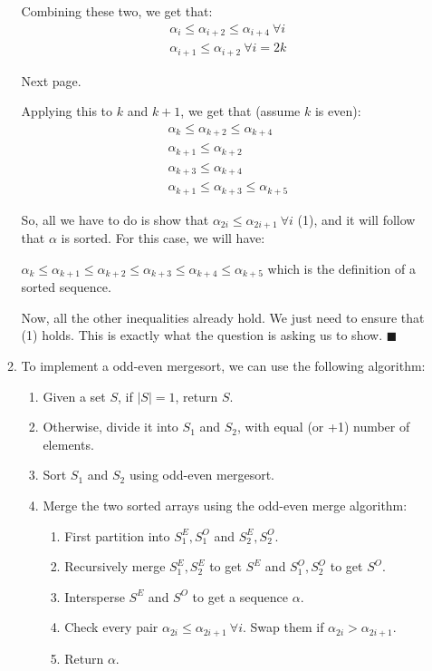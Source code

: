 \documentclass[a4paper]{article}
\begin{document}
\begin{enumerate}
\begin{enumerate}
    Combining these two, we get that:
    \begin{align*}
        \alpha_{i} \leq \alpha_{i + 2} \leq \alpha_{i + 4}\ \forall i\\
        \alpha_{i+1} \leq \alpha_{i + 2}\ \forall i = 2k
    \end{align*}

    Next page.
    \newpage

    Applying this to $k$ and $k+1$, we get that (assume $k$ is even):
    \begin{align*}
        \alpha_{k} \leq \alpha_{k+2} \leq \alpha_{k+4}\\
        \alpha_{k+1} \leq \alpha_{k + 2}\\
        \alpha_{k+3} \leq \alpha_{k + 4}\\
        \alpha_{k+1} \leq \alpha_{k+3} \leq \alpha_{k+5}
    \end{align*}
    
    So, all we have to do is show that $\alpha_{2i} \leq \alpha_{2i+1}\ \forall i$ (1), and it will follow that $\alpha$ is sorted. For this case, we will have:

    $\alpha_k \leq \alpha_{k+1} \leq \alpha_{k+2} \leq \alpha_{k+3} \leq \alpha_{k+4} \leq \alpha_{k+5}$ which is the definition of a sorted sequence.

    Now, all the other inequalities already hold. We just need to ensure that (1) holds. This is exactly what the question is asking us to show. $\blacksquare$\\


    \item To implement a odd-even mergesort, we can use the following algorithm:

    \begin{enumerate}[label=\arabic*.]
        \item Given a set $S$, if $|S| = 1$, return $S$.
        \item Otherwise, divide it into $S_1$ and $S_2$, with equal (or +1) number of elements.
        \item Sort $S_1$ and $S_2$ using odd-even mergesort.
        \item Merge the two sorted arrays using the odd-even merge algorithm:
        \begin{enumerate}
            \item First partition into $S^E_1, S^O_1$ and $S^E_2, S^O_2$.
            \item Recursively merge $S^E_1, S^E_2$ to get $S^E$ and $S^O_1, S^O_2$ to get $S^O$.
            \item Intersperse $S^E$ and $S^O$ to get a sequence $\alpha$.
            \item Check every pair $\alpha_{2i} \leq \alpha_{2i+1}\ \forall i$. Swap them if $\alpha_{2i} > \alpha_{2i+1}$.
            \item Return $\alpha$.
        \end{enumerate}
    \end{enumerate}
    

\end{enumerate}
\end{enumerate}
\end{document}
